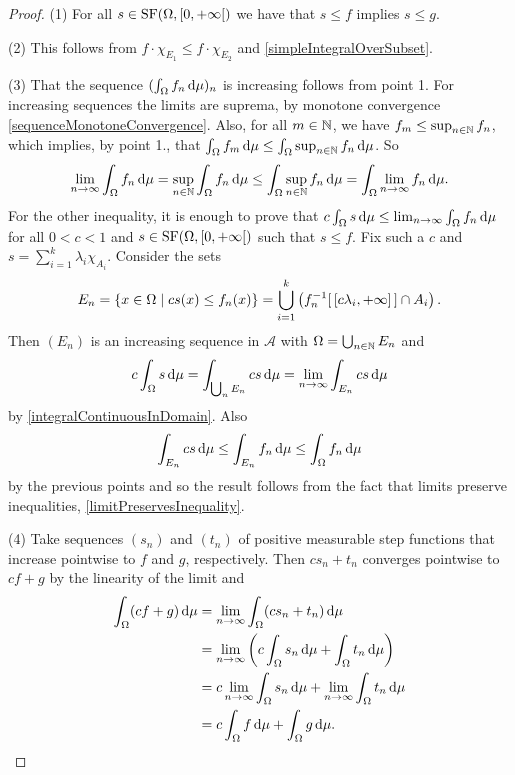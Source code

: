 \begin{proof}
(1) For all $s\in \SF(\Omega, \interval[co]{0,+\infty})$ we have that $s\leq f$ implies $s\leq g$.

(2) This follows from $f\cdot\chi_{E_1}\leq f\cdot\chi_{E_2}$ and \ref{simpleIntegralOverSubset}.

(3) That the sequence $(\int_\Omega f_n\operatorname{d \!}{\mu})_n$ is increasing follows from point 1. For increasing sequences the limits are suprema, by monotone convergence \ref{sequenceMonotoneConvergence}. Also, for all $m\in\mathbb{N}$, we have $f_m\leq\sup_{n\in\mathbb{N}}f_n$, which implies, by point 1., that $\int_\Omega f_m\operatorname{d \!}{\mu}\leq \int_\Omega \sup_{n\in\mathbb{N}}f_n\operatorname{d \!}{\mu}$. So
\[ \lim_{n\to\infty}\int_\Omega f_n\operatorname{d \!}{\mu} = \sup_{n\in\mathbb{N}}\int_\Omega f_n\operatorname{d \!}{\mu} \leq \int_\Omega \sup_{n\in\mathbb{N}}f_n\operatorname{d \!}{\mu} = \int_\Omega \lim_{n\to\infty}f_n\operatorname{d \!}{\mu}. \]
For the other inequality, it is enough to prove that $c\int_\Omega s\operatorname{d \!}{\mu} \leq \lim_{n\to\infty}\int_\Omega f_n\operatorname{d \!}{\mu}$ for all $0<c<1$ and $s\in\operatorname{SF}(\Omega,[0,+\infty[)$ such that $s\leq f$. Fix such a $c$ and $s = \sum_{i=1}^k\lambda_i\chi_{A_i}$. Consider the sets
\[ E_n = \left\{ x\in\Omega \;\middle|\; cs(x)\leq f_n(x) \right\} = \bigcup_{i=1}^k \left(f^{-1}_n[\,[c\lambda_i, +\infty]\,]\cap A_i\right). \]
Then $(E_n)$ is an increasing sequence in $\mathcal{A}$ with $\Omega= \bigcup_{n\in\mathbb{N}}E_n$ and
\[ c\int_\Omega s\operatorname{d \!}{\mu} = \int_{\bigcup_n E_n} cs\operatorname{d \!}{\mu} = \lim_{n\to\infty}\int_{E_n} cs\operatorname{d \!}{\mu} \]
by \ref{integralContinuousInDomain}. Also 
\[ \int_{E_n} cs\operatorname{d \!}{\mu} \leq \int_{E_n} f_n\operatorname{d \!}{\mu} \leq \int_{\Omega} f_n\operatorname{d \!}{\mu} \]
by the previous points and so the result follows from the fact that limits preserve inequalities, \ref{limitPreservesInequality}.

(4) Take sequences $(s_n)$ and $(t_n)$ of positive measurable step functions
that increase pointwise to $f$ and $g$, respectively. Then $cs_n+t_n$ converges pointwise to $cf+g$ by the linearity of the limit and
\begin{align*}
\int_\Omega(cf+g)\diff{\mu} &= \lim_{n\to\infty}\int_\Omega(cs_n+t_n)\diff{\mu} \\
&= \lim_{n\to\infty}\left(c\int_\Omega s_n\diff{\mu}+\int_\Omega t_n\diff{\mu}\right) \\
&= c\lim_{n\to\infty}\int_\Omega s_n\diff{\mu}+\lim_{n\to\infty}\int_\Omega t_n\diff{\mu} \\
&= c\int_\Omega f\diff{\mu} + \int_\Omega g\diff{\mu}.
\end{align*}
\end{proof}

